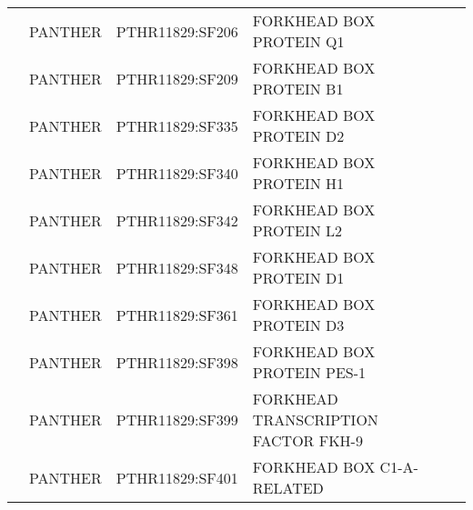 \documentclass[../main.tex]{subfiles}
\begin{document}
\begin{landscape}
\begin{longtable}{@{}cllll@{}}
		                                & PANTHER              & PTHR11829:SF206 & FORKHEAD BOX PROTEIN Q1                                                                                                                      & \\
		                                & PANTHER              & PTHR11829:SF209 & FORKHEAD BOX PROTEIN B1                                                                                                                      & \\
		                                & PANTHER              & PTHR11829:SF335 & FORKHEAD BOX PROTEIN D2                                                                                                                      & \\
		                                & PANTHER              & PTHR11829:SF340 & FORKHEAD BOX PROTEIN H1                                                                                                                      & \\
		                                & PANTHER              & PTHR11829:SF342 & FORKHEAD BOX PROTEIN L2                                                                                                                      & \\
		                                & PANTHER              & PTHR11829:SF348 & FORKHEAD BOX PROTEIN D1                                                                                                                      & \\
		                                & PANTHER              & PTHR11829:SF361 & FORKHEAD BOX PROTEIN D3                                                                                                                      & \\
		                                & PANTHER              & PTHR11829:SF398 & FORKHEAD BOX PROTEIN PES-1                                                                                                                   & \\
		                                & PANTHER              & PTHR11829:SF399 & FORKHEAD TRANSCRIPTION FACTOR FKH-9                                                                                                          & \\
		                                & PANTHER              & PTHR11829:SF401 & FORKHEAD BOX C1-A-RELATED                                                                                                                    & \\

\end{longtable}
\end{landscape}
\end{document}
